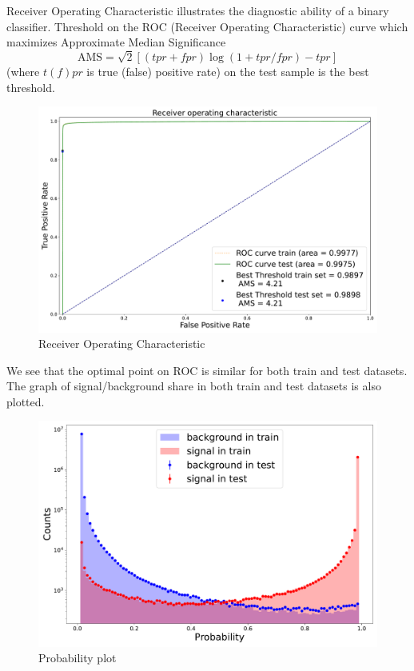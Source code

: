 Receiver Operating Characteristic illustrates the diagnostic ability of a binary classifier. Threshold on the ROC (Receiver Operating Characteristic) curve which maximizes Approximate Median Significance 
\begin{equation}
    \text{AMS}= \sqrt{2} [(tpr + fpr) \log(1 + tpr/fpr) - tpr]
\end{equation}
(where $t(f)pr$ is true (false) positive rate) on the test sample is the best threshold.
\begin{figure}[H]
    \centering
    \includegraphics[width=1\textwidth]{img/ams.pdf}
    \caption{Receiver Operating Characteristic}
\end{figure}
We see that the optimal point on ROC is similar for both train and test datasets.
The graph of signal/background share in both train and test datasets is also plotted.
\begin{figure}[H]
    \centering
    \includegraphics[width=.8\textwidth]{img/probability.pdf}
    \caption{Probability plot}
\end{figure}

